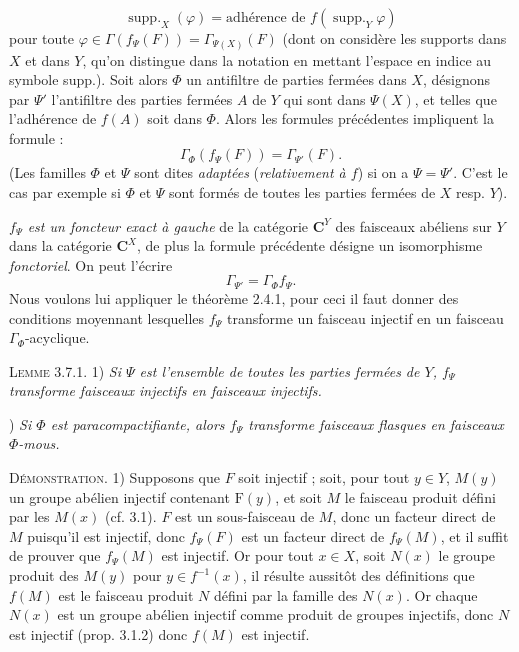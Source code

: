 
\[
\operatorname{supp.}_{X}(\varphi)
=\text{adhérence de }f(\operatorname{supp.}_{Y}\varphi)
\]
pour toute $\varphi\in\Gamma(f_\Psi(F))=\Gamma_{\Psi(X)}(F)$ (dont on
considère les supports dans $X$ et dans $Y$, qu'on distingue dans la notation
en mettant l'espace en indice au symbole supp.).
Soit alors $\Phi$ un antifiltre de parties fermées dans $X$, désignons par
$\Psi'$ l'antifiltre des parties fermées $A$ de $Y$ qui sont dans $\Psi(X)$,
et telles que l'adhérence de $f(A)$ soit dans $\Phi$. Alors les formules
précédentes impliquent la formule :
\[
\Gamma_\Phi(f_\Psi(F))=\Gamma_{\Psi'}(F).
\]
(Les familles $\Phi$ et $\Psi$ sont dites \textit{adaptées} (\textit{relativement à
$f$}) si on a $\Psi=\Psi'$. C'est le cas par exemple si $\Phi$ et $\Psi$ sont
formés de toutes les parties fermées de $X$ resp. $Y$).

\textit{$f_\Psi$ est un foncteur exact à gauche} de la catégorie $\mathbf C^Y$ des
faisceaux abéliens sur $Y$ dans la catégorie $\mathbf C^X$, de plus la formule
précédente désigne un isomorphisme \textit{fonctoriel}. On peut l'écrire
\[
\Gamma_{\Psi'}=\Gamma_\Phi f_\Psi.
\]
Nous voulons lui appliquer le théorème 2.4.1, pour ceci il faut donner des
conditions moyennant lesquelles $f_\Psi$ transforme un faisceau injectif en
un faisceau $\Gamma_\Phi$-acyclique.

\indent\textsc{Lemme 3.7.1.}
1) \textit{Si $\Psi$ est l'ensemble de toutes les parties
fermées de $Y$, $f_\Psi$ transforme faisceaux injectifs en faisceaux
injectifs.}

) \textit{Si $\Phi$ est paracompactifiante, alors $f_\Psi$
transforme faisceaux flasques en faisceaux $\Phi$-mous.}

\indent\textsc{Démonstration.} 1) Supposons que $F$ soit injectif ; soit,
pour tout $y\in Y$, $M(y)$ un groupe abélien injectif contenant $\mathrm F(y)$, et
soit $M$ le faisceau produit défini par les $M(x)$ (cf. 3.1). $F$ est un
sous-faisceau de $M$, donc un facteur direct de $M$ puisqu'il est injectif,
donc $f_\Psi(F)$ est un facteur direct de $f_\Psi(M)$, et il suffit de prouver
que $f_\Psi(M)$ est injectif.
Or pour tout $x\in X$, soit $N(x)$ le groupe produit des $M(y)$ pour
$y\in f^{-1}(x)$, il résulte aussitôt des définitions que $f(M)$ est le
faisceau produit $N$ défini par la famille des $N(x)$. Or chaque $N(x)$ est un
groupe abélien injectif comme produit de groupes injectifs, donc $N$ est
injectif (prop. 3.1.2) donc $f(M)$ est injectif.

